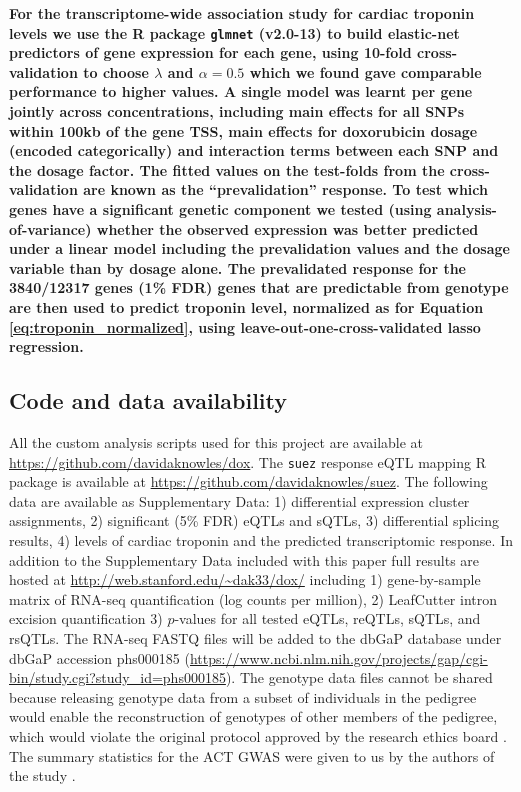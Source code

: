 \documentclass{article}
\newcommand{\tempbold}[1]{\textbf{#1}}
\begin{document}
\tempbold{For the transcriptome-wide association study for cardiac troponin levels we use the R package \texttt{glmnet} (v2.0-13) to build elastic-net predictors of gene expression for each gene, using 10-fold cross-validation to choose $\lambda$ and $\alpha=0.5$ which we found gave comparable performance to higher values. A single model was learnt per gene jointly across concentrations, including main effects for all SNPs within 100kb of the gene TSS, main effects for doxorubicin dosage (encoded categorically) and interaction terms between each SNP and the dosage factor. The fitted values on the test-folds from the cross-validation are known as the ``prevalidation'' response. To test which genes have a significant genetic component we tested (using analysis-of-variance) whether the observed expression was better predicted under a linear model including the prevalidation values and the dosage variable than by dosage alone. The prevalidated response for the 3840/12317 genes (1\% FDR) genes that are predictable from genotype are then used to predict troponin level, normalized as for Equation \ref{eq:troponin_normalized}, using leave-out-one-cross-validated lasso regression.} 

\subsection*{Code and data availability}

All the custom analysis scripts used for this project are available at \url{https://github.com/davidaknowles/dox}. 
The \texttt{suez} response eQTL mapping R package is available at \url{https://github.com/davidaknowles/suez}. 
The following data are available as Supplementary Data: 1) differential expression cluster assignments, 2) significant (5\% FDR) eQTLs and sQTLs, 3) differential splicing results, 4) levels of cardiac troponin and the predicted transcriptomic response. 
In addition to the Supplementary Data included with this paper full results are hosted at \url{http://web.stanford.edu/~dak33/dox/} including 1) gene-by-sample matrix of RNA-seq quantification (log counts per million), 2) LeafCutter intron excision quantification 3) $p$-values for all tested eQTLs, reQTLs, sQTLs, and rsQTLs. 
The RNA-seq FASTQ files will be added to the dbGaP database \cite{Tryka2014} under dbGaP accession phs000185
(\url{https://www.ncbi.nlm.nih.gov/projects/gap/cgi-bin/study.cgi?study_id=phs000185}).
The genotype data files cannot be shared because releasing genotype data
from a subset of individuals in the pedigree would enable the reconstruction of
genotypes of other members of the pedigree, which would violate the original
protocol approved by the research ethics board \cite{Livne2015}. 
The summary statistics for the ACT GWAS were given to us by the authors of the study
\cite{Schneider2016}.
\end{document}
